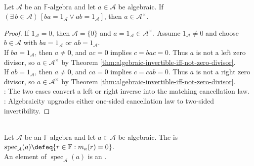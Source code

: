 \begin{corollary} \label{cor:algebraic-one-sided-inverse-two-sided} \\
Let $\mathcal{A}$ be an $\mathbb{F}$-algebra and let $a\in\mathcal{A}$ be algebraic. If $(\exists\,b\in\mathcal{A})\,[ba=1_{\mathcal{A}}\lor ab=1_{\mathcal{A}}]$, then $a\in\mathcal{A}^{\times}$.
\begin{proof}
If $1_{\mathcal{A}}=0$, then $\mathcal{A}=\{0\}$ and $a=1_{\mathcal{A}}\in\mathcal{A}^{\times}$. Assume $1_{\mathcal{A}}\neq0$ and choose $b\in\mathcal{A}$ with $ba=1_{\mathcal{A}}$ or $ab=1_{\mathcal{A}}$.\\
If $ba=1_{\mathcal{A}}$, then $a\neq0$, and $ac=0$ implies $c=bac=0$. Thus $a$ is not a left zero divisor, so $a\in\mathcal{A}^{\times}$ by Theorem \ref{thm:algebraic-invertible-iff-not-zero-divisor}.\\
If $ab=1_{\mathcal{A}}$, then $a\neq0$, and $ca=0$ implies $c=cab=0$. Thus $a$ is not a right zero divisor, so $a\in\mathcal{A}^{\times}$ by Theorem \ref{thm:algebraic-invertible-iff-not-zero-divisor}.\\
: The two cases convert a left or right inverse into the matching cancellation law.\\
: Algebraicity upgrades either one-sided cancellation law to two-sided invertibility.
\end{proof}
\end{corollary}

\begin{definition} \label{def:algebra-spectrum} \\
Let $\mathcal{A}$ be an $\mathbb{F}$-algebra and let $a\in\mathcal{A}$ be algebraic. The  is $\operatorname{spec}_{\mathcal{A}}(a)\defeq\{r\in\mathbb{F}:m_a(r)=0\}$.\\
An element of $\operatorname{spec}_{\mathcal{A}}(a)$ is an .
\end{definition}

